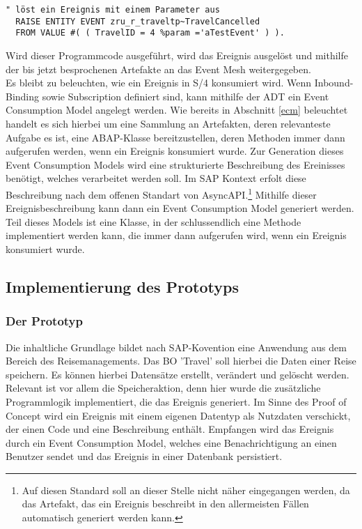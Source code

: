 \begin{lstlisting}[language=ABAP]
  " löst ein Ereignis mit einem Parameter aus
  RAISE ENTITY EVENT zru_r_traveltp~TravelCancelled
  FROM VALUE #( ( TravelID = 4 %param ='aTestEvent' ) ).
\end{lstlisting}

Wird dieser Programmcode ausgeführt, wird das Ereignis ausgelöst und mithilfe der bis jetzt besprochenen Artefakte an das Event Mesh weitergegeben.\\

Es bleibt zu beleuchten, wie ein Ereignis in S/4 konsumiert wird. Wenn Inbound-Binding sowie Subscription definiert sind, kann mithilfe der \ac{ADT} ein Event Consumption Model angelegt werden. Wie bereits in Abschnitt \ref{ecm} beleuchtet handelt es sich hierbei um eine Sammlung an Artefakten, deren relevanteste Aufgabe es ist, eine \ac{ABAP}-Klasse bereitzustellen, deren Methoden immer dann aufgerufen werden, wenn ein Ereignis konsumiert wurde. Zur Generation dieses Event Consumption Models wird eine strukturierte Beschreibung des Ereinisses benötigt, welches verarbeitet werden soll. Im SAP Kontext erfolt diese Beschreibung nach dem offenen Standart von AsyncAPI.\footnote{Auf diesen Standard soll an dieser Stelle nicht näher eingegangen werden, da das Artefakt, das ein Ereignis beschreibt in den allermeisten Fällen automatisch generiert werden kann.} Mithilfe dieser Ereignisbeschreibung kann dann ein Event Consumption Model generiert werden. Teil dieses Models ist eine Klasse, in der schlussendlich eine Methode implementiert werden kann, die immer dann aufgerufen wird, wenn ein Ereignis konsumiert wurde.\\

\subsection{Implementierung des Prototyps}

\subsubsection*{Der Prototyp}
Die inhaltliche Grundlage bildet nach SAP-Kovention eine Anwendung aus dem Bereich des Reisemanagements. Das \ac{BO} 'Travel' soll hierbei die Daten einer Reise speichern. Es können hierbei Datensätze erstellt, verändert und gelöscht werden. Relevant ist vor allem die Speicheraktion, denn hier wurde die zusätzliche Programmlogik implementiert, die das Ereignis generiert. Im Sinne des Proof of Concept wird ein Ereignis mit einem eigenen Datentyp als Nutzdaten verschickt, der einen Code und eine Beschreibung enthält. 
Empfangen wird das Ereignis durch ein Event Consumption Model, welches eine Benachrichtigung an einen Benutzer sendet und das Ereignis in einer Datenbank persistiert.\\
